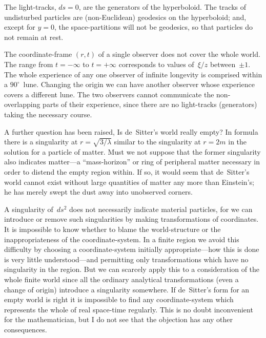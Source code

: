 \documentclass[12pt]{book}
\begin{document}
The light-tracks, $ds = 0$, are the generators of the hyperboloid. The tracks
of undisturbed particles are (non-Euclidean) geodesics on the hyperboloid;
and, except for $y = 0$, the space-partitions will not be geodesics, so that
particles do not remain at rest.

The coordinate-frame $(r, t)$ of a single observer does not cover the whole
world. The range from $t = -\infty$ to $t = +\infty$ corresponds to values of~$\xi/z$
between~$\pm1$. The whole experience of any one observer of infinite longevity
is comprised within a $90^{\circ}$~lune. Changing the origin we can have another
observer whose experience covers a different lune. The two observers cannot
communicate the non-overlapping parts of their experience, since there are
no light-tracks (generators) taking the necessary course.

A further question has been raised, Is de~Sitter's world really empty? In
%
%
formula~ there is a singularity at $r = \sqrt{3/\lambda}$ similar to the singularity
at $r = 2m$ in the solution for a particle of matter. Must we not suppose that
the former singularity also indicates matter---a ``mass-horizon'' or ring of
peripheral matter necessary in order to distend the empty region within. If
so, it would seem that de~Sitter's world cannot exist without large quantities
of matter any more than Einstein's; he has merely swept the dust away into
unobserved corners.

A singularity of~$ds^{2}$ does not necessarily indicate material particles, for
we can introduce or remove such singularities by making transformations of
coordinates. It is impossible to know whether to blame the world-structure
or the inappropriateness of the coordinate-system. In a finite region we avoid
this difficulty by choosing a coordinate-system initially appropriate---how this
is done is very little understood---and permitting only transformations which
have no singularity in the region. But we can scarcely apply this to a
consideration of the whole finite world since all the ordinary analytical transformations
%
%
(even a change of origin) introduce a singularity somewhere. If
de~Sitter's form for an empty world is right it is impossible to find any
coordinate-system which represents the whole of real space-time regularly.
This is no doubt inconvenient for the mathematician, but I do not see that
the objection has any other consequences.
\end{document}
